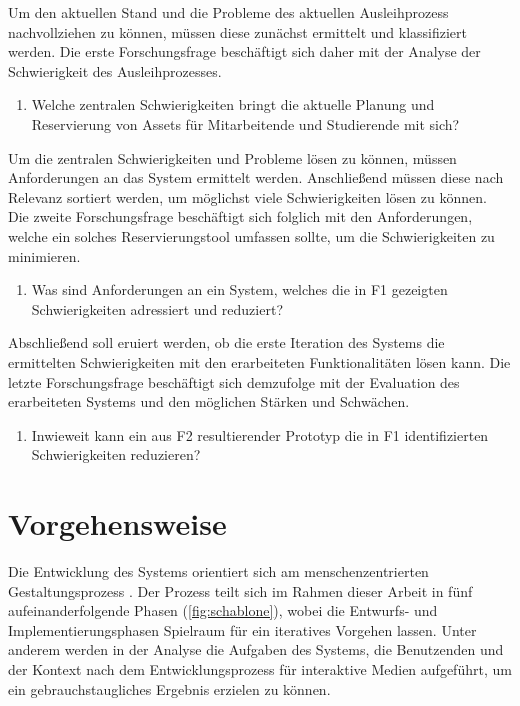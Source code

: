 Um den aktuellen Stand und die Probleme des aktuellen Ausleihprozess nachvollziehen zu können,
müssen diese zunächst ermittelt und klassifiziert werden. Die erste Forschungsfrage beschäftigt sich
daher mit der Analyse der Schwierigkeit des Ausleihprozesses.
\begin{enumerate}
  \item[\sffamily\color{maincolor} {F1 |}] {Welche zentralen Schwierigkeiten bringt die aktuelle Planung und Reservierung von Assets für Mitarbeitende und Studierende mit sich?}
\end{enumerate}

Um die zentralen Schwierigkeiten und Probleme lösen zu können, müssen Anforderungen an das System
ermittelt werden. Anschließend müssen diese nach Relevanz sortiert werden, um möglichst viele
Schwierigkeiten lösen zu können. Die zweite Forschungsfrage beschäftigt sich folglich mit den
Anforderungen, welche ein solches Reservierungstool umfassen sollte, um die Schwierigkeiten zu minimieren.

\begin{enumerate}
  \item[\sffamily\color{maincolor} {F2 |}] {Was sind Anforderungen an ein System, welches die in F1 gezeigten Schwierigkeiten adressiert und reduziert?}
\end{enumerate}

Abschließend soll eruiert werden, ob die erste Iteration des Systems die ermittelten Schwierigkeiten
mit den erarbeiteten Funktionalitäten lösen kann. Die letzte Forschungsfrage beschäftigt sich
demzufolge mit der Evaluation des erarbeiteten Systems und den möglichen Stärken und Schwächen.

\begin{enumerate}
  \item[\sffamily\color{maincolor} {F3 |}] {Inwieweit kann ein aus F2 resultierender Prototyp die in F1 identifizierten Schwierigkeiten reduzieren?}
\end{enumerate}

\section{Vorgehensweise}
Die Entwicklung des Systems orientiert sich am menschenzentrierten Gestaltungsprozess
\cite{din_en_iso_9421-2102020-03_din_nodate}. Der Prozess teilt sich im Rahmen dieser Arbeit in
fünf aufeinanderfolgende Phasen (\ref{fig:schablone}), wobei die Entwurfs- und Implementierungsphasen
Spielraum für ein iteratives Vorgehen lassen. Unter anderem werden in der Analyse die Aufgaben des
Systems, die Benutzenden und der Kontext nach dem Entwicklungsprozess für interaktive Medien
\cite{herczeg_einfuhrung_2009} aufgeführt, um ein gebrauchstaugliches Ergebnis erzielen zu können.

